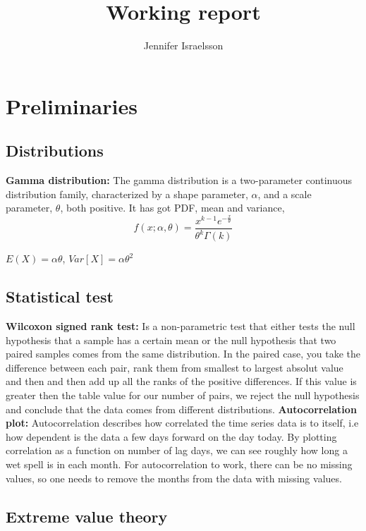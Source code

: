 \documentclass{article}
\author{Jennifer Israelsson}
\begin{document}
	\title{Working report}
	\maketitle
	
	\section{Preliminaries}
	
	\subsection{Distributions}
	\textbf{Gamma distribution: } The gamma distribution is a two-parameter continuous distribution family, characterized by a shape parameter, $\alpha$, and a scale parameter, $\theta$, both positive. It has got PDF, mean and variance,
	\begin{equation}
	f(x ; \alpha, \theta) = \frac{x^{k-1} e^{-\frac{x}{\theta}}}{\theta^k \Gamma(k)}
	\end{equation}
	\begin{center}
	$E(X) = \alpha\theta$, $Var[X] = \alpha\theta^2$
	\end{center}
	
	\subsection{Statistical test}
	\textbf{Wilcoxon signed rank test:} Is a non-parametric test that either tests the null hypothesis that a sample has a certain mean or the null hypothesis that two paired samples comes from the same distribution. In the paired case, you take the difference between each pair, rank them from smallest to largest absolut value and then and then add up all the ranks of the positive differences. If this value is greater then the table value for our number of pairs, we reject the null hypothesis and conclude that the data comes from different distributions.\cite{PennState} \linebreak
	\textbf{Autocorrelation plot:} Autocorrelation describes how correlated the time series data is to itself, i.e how dependent is the data a few days forward on the day today. By plotting correlation as a function on number of lag days, we can see roughly how long a wet spell is in each month. For autocorrelation to work, there can be no missing values, so one needs to remove the months from the data with missing values. 
	\subsection{Extreme value theory}
\end{document}
